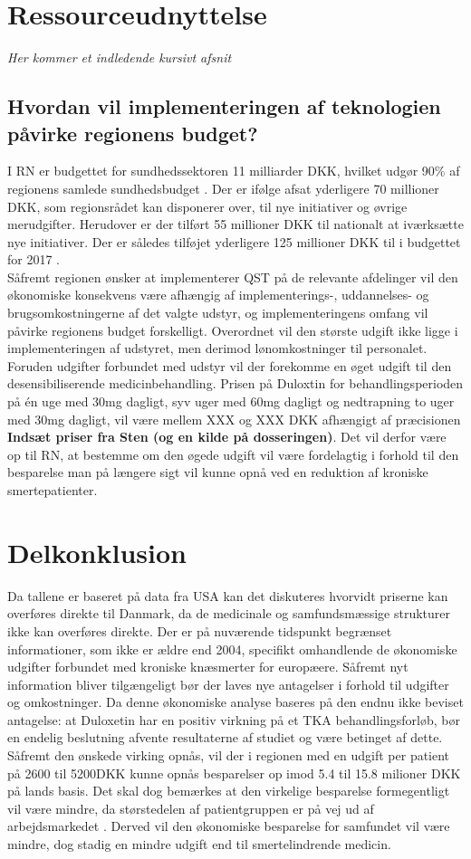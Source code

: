 \section{Ressourceudnyttelse}
\textit{Her kommer et indledende kursivt afsnit}

\subsection{Hvordan vil implementeringen af teknologien påvirke regionens budget?}
I RN er budgettet for sundhedssektoren 11 milliarder DKK, hvilket udgør 90\% af regionens samlede sundhedsbudget \citep{RnBudget17}. Der er ifølge  afsat yderligere 70 millioner DKK, som regionsrådet kan disponerer over, til nye initiativer og øvrige merudgifter. Herudover er der tilført 55 millioner DKK til nationalt at iværksætte nye initiativer. Der er således tilføjet yderligere 125 millioner DKK til i budgettet for 2017 \citep{RnBudget17}. \\
Såfremt regionen ønsker at implementerer QST på de relevante afdelinger vil den økonomiske konsekvens være afhængig af implementerings-, uddannelses- og brugsomkostningerne af det valgte udstyr, og implementeringens omfang vil påvirke regionens budget forskelligt. Overordnet vil den største udgift ikke ligge i implementeringen af udstyret, men derimod lønomkostninger til personalet. Foruden udgifter forbundet med udstyr vil der forekomme en øget udgift til den desensibiliserende medicinbehandling. Prisen på Duloxtin for behandlingsperioden på én uge med 30mg dagligt, syv uger med 60mg dagligt og nedtrapning to uger med 30mg dagligt, vil være mellem XXX og XXX DKK afhængigt af præcisionen \textbf{Indsæt priser fra Sten (og en kilde på dosseringen)}. Det vil derfor være op til RN, at bestemme om den øgede udgift vil være fordelagtig i forhold til den besparelse man på længere sigt vil kunne opnå ved en reduktion af kroniske smertepatienter.

\section{Delkonklusion}
Da tallene er baseret på data fra USA kan det diskuteres hvorvidt priserne kan overføres direkte til Danmark, da de medicinale og samfundsmæssige strukturer ikke kan overføres direkte. Der er på nuværende tidspunkt begrænset informationer, som ikke er ældre end 2004, specifikt omhandlende de økonomiske udgifter forbundet med kroniske knæsmerter for europæere. Såfremt nyt information bliver tilgængeligt bør der laves nye antagelser i forhold til udgifter og omkostninger. 
Da denne økonomiske analyse baseres på den endnu ikke beviset antagelse: at Duloxetin har en positiv virkning på et TKA behandlingsforløb, bør en endelig beslutning afvente resultaterne af studiet og være betinget af dette. Såfremt den ønskede virking opnås, vil der i regionen med en udgift per patient på 2600 til 5200DKK kunne opnås besparelser op imod 5.4 til 15.8 milioner DKK på lands basis. Det skal dog bemærkes at den virkelige besparelse formegentligt vil være mindre, da størstedelen af patientgruppen er på vej ud af arbejdsmarkedet \citep{Holmberg2015}. Derved vil den økonomiske besparelse for samfundet vil være mindre, dog stadig en mindre udgift end til smertelindrende medicin. 